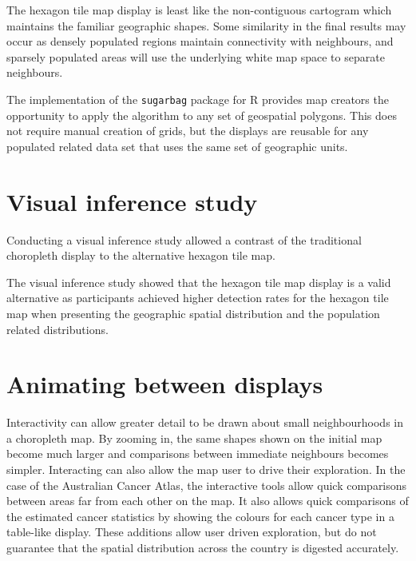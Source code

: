 \documentclass{monashthesis}
\begin{document}
The hexagon tile map display is least like the non-contiguous cartogram \autocite{NAC} which maintains the familiar geographic shapes. Some similarity in the final results may occur as densely populated regions maintain connectivity with neighbours, and sparsely populated areas will use the underlying white map space to separate neighbours.

The implementation of the \texttt{sugarbag} \autocite{sugarbag} package for R \autocite{R} provides map creators the opportunity to apply the algorithm to any set of geospatial polygons. This does not require manual creation of grids, but the displays are reusable for any populated related data set that uses the same set of geographic units.

\hypertarget{visual-inference-study-1}{%
\section{Visual inference study}\label{visual-inference-study-1}}

Conducting a visual inference study allowed a contrast of the traditional choropleth display to the alternative hexagon tile map.

The visual inference study showed that the hexagon tile map display is a valid alternative as participants achieved higher detection rates for the hexagon tile map when presenting the geographic spatial distribution and the population related distributions.

\hypertarget{animating-between-displays}{%
\section{Animating between displays}\label{animating-between-displays}}

Interactivity can allow greater detail to be drawn about small neighbourhoods in a choropleth map. By zooming in, the same shapes shown on the initial map become much larger and comparisons between immediate neighbours becomes simpler.
Interacting can also allow the map user to drive their exploration. In the case of the Australian Cancer Atlas, the interactive tools allow quick comparisons between areas far from each other on the map. It also allows quick comparisons of the estimated cancer statistics by showing the colours for each cancer type in a table-like display. These additions allow user driven exploration, but do not guarantee that the spatial distribution across the country is digested accurately.
\end{document}
